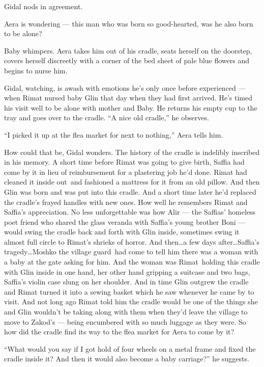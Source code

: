 \documentclass[twoside,11pt,openany]{book}
\begin{document}
Gidal nods in agreement.

Aera is wondering --- this man who was born so good-hearted, was he also born to be alone?

Baby whimpers. Aera takes him out of his cradle, seats herself on the doorstep, covers herself
discreetly with a corner of the bed sheet of pale blue flowers and begins to
nurse him.

Gidal, watching, is awash with emotions{ }he's only once before experienced --- when Rimat nursed baby
Glin that day when they had first arrived. He's timed his visit well to be alone with mother and Baby. He returns his
empty cup to the tray and goes over to the cradle. ``A nice old cradle,'' he
observes{.}

``I picked it up at the flea market for next to nothing,'' Aera tells
him{.}

How could that be, Gidal wonders. The history of the cradle is indelibly inscribed in his memory. A short time before
Rimat was going to give birth, Saffia had come by it in lieu of reimbursement for a plastering
job{ }he'd done. Rimat had cleaned it inside out~and fashioned a mattress for
it from an old pillow. And then Glin was born and was put into this cradle. And a short time later he'd replaced
the cradle's frayed handles with new ones. How well he remembers Rimat and Saffia's appreciation. No less unforgettable
was how Alir --- the Saffias{'} homeless poet friend who shared the glass veranda with Saffia's young brother Boni ---
would swing the cradle back and forth with Glin inside, sometimes swing it almost full circle to Rimat's shrieks of
horror. And then{\ldots}a few days after{\ldots}Saffia's tragedy{\ldots}Moshko the village guard~had come to tell him
there was a woman with a baby at the gate asking for him. And the woman was Rimat~holding this cradle with Glin inside
in one hand, her other hand gripping a suitcase and two bags, Saffia's violin case slung on her shoulder. And in time
Glin outgrew the cradle and Rimat turned it into a sewing basket which he saw whenever he came by to visit. And not
long ago Rimat told him the cradle would be one of the things she and Glin wouldn't be taking along with them when
they'd leave the village to move to Zakod's --- being encumbered with so
much luggage as they were. So how did the cradle find its way to the flea market for Aera to come by it?

``What would you say if I got hold of four wheels on a metal frame and fixed the cradle inside it? And then
it would also become a baby carriage?''   he suggests.
\end{document}
